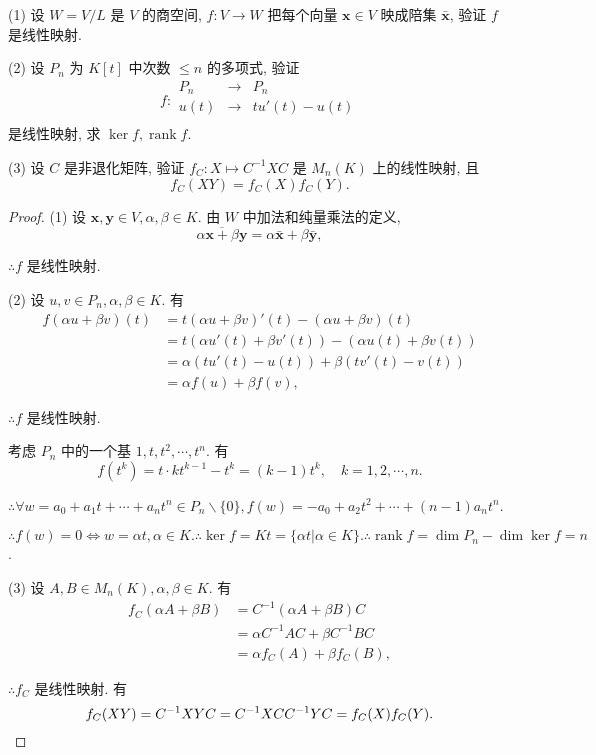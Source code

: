 \documentclass{ctexart}
\begin{document}
\begin{exercise}\label{ex1.2}
    (1) 设 $W=V/L$ 是 $V$ 的商空间, $f:V\to W$ 把每个向量 $\boldsymbol{x}\in V$ 映成陪集 $\bar{\boldsymbol{x}}$, 验证 $f$ 是线性映射.

    (2) 设 $P_n$ 为 $K[t]$ 中次数 $\leq n$ 的多项式, 验证
    \[f:\begin{array}{rcl}
        P_n & \to & P_n \\
        u(t) & \to & tu'(t)-u(t) \\
    \end{array}\]
    是线性映射, 求 $\ker f,\operatorname{rank}f$.

    (3) 设 $C$ 是非退化矩阵, 验证 $f_C:X\mapsto C^{-1}XC$ 是 $M_n(K)$ 上的线性映射, 且
    \[f_C(XY)=f_C(X)f_C(Y).\]
\end{exercise}
\begin{proof}
    (1) 设 $\boldsymbol{x},\boldsymbol{y}\in V,\alpha,\beta\in K$. 由 $W$ 中加法和纯量乘法的定义,
    \[\overline{\alpha\boldsymbol{x}+\beta\boldsymbol{y}}=\alpha\bar{\boldsymbol{x}}+\beta\bar{\boldsymbol{y}},\]

    $\therefore f$ 是线性映射.

    (2) 设 $u,v\in P_n,\alpha,\beta\in K$. 有
    \begin{align*}
        f(\alpha u+\beta v)(t) & =t(\alpha u+\beta v)'(t)-(\alpha u+\beta v)(t) \\
        & =t(\alpha u'(t)+\beta v'(t))-(\alpha u(t)+\beta v(t)) \\
        & =\alpha(tu'(t)-u(t))+\beta(tv'(t)-v(t)) \\
        & =\alpha f(u)+\beta f(v),
    \end{align*}

    $\therefore f$ 是线性映射.

    考虑 $P_n$ 中的一个基 $1,t,t^2,\cdots,t^n$. 有
    \[f(t^k)=t\cdot kt^{k-1}-t^k=(k-1)t^k,\quad k=1,2,\cdots,n.\]

    $\therefore\forall w=a_0+a_1t+\cdots+a_nt^n\in P_n\backslash\{0\},f(w)=-a_0+a_2t^2+\cdots+(n-1)a_nt^n$.

    $\therefore f(w)=0\Leftrightarrow w=\alpha t,\alpha\in K.\therefore\ker f=Kt=\{\alpha t|\alpha\in K\}.\therefore\operatorname{rank}f=\dim P_n-\dim\ker f=n$.

    (3) 设 $A,B\in M_n(K),\alpha,\beta\in K$. 有
    \begin{align*}
        f_C(\alpha A+\beta B) & =C^{-1}(\alpha A+\beta B)C \\
        & =\alpha C^{-1}AC+\beta C^{-1}BC \\
        & =\alpha f_C(A)+\beta f_C(B),
    \end{align*}

    $\therefore f_C$ 是线性映射. 有
    \[f_C(XY)=C^{-1}XYC=C^{-1}XCC^{-1}YC=f_C(X)f_C(Y).\qedhere\]
\end{proof}
\end{document}
